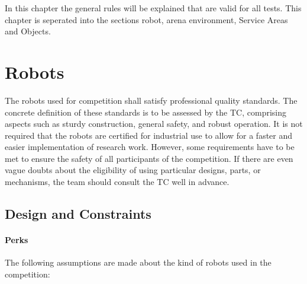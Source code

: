 
In this chapter the general rules will be explained that are valid for all tests. This chapter is seperated into the sections robot, arena environment, Service Areas and Objects.

\section{Robots}
The robots used for competition shall satisfy professional quality standards. The concrete definition of these standards is to be assessed by the TC, comprising aspects such as sturdy construction, general safety, and robust operation. It is not required that the robots are certified for industrial use to allow for a faster and easier implementation of research work. However, some requirements have to be met to ensure the safety of all participants of the competition. If there are even vague doubts about the eligibility of using particular designs, parts, or mechanisms, the team should consult the TC well in advance.

\subsection{Design and Constraints} \label{ssec:RobotDesignAndConstraints}

\paragraph{Perks}
The following assumptions are made about the kind of robots used in the competition:

